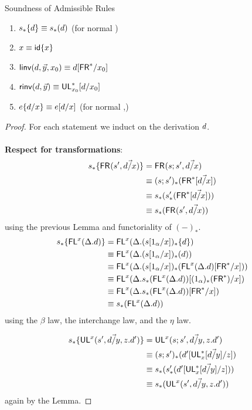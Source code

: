 \begin{theorem}{Soundness of Admissible Rules} \label{thm:admissible-soundess}
\begin{enumerate}
\item $s_*\{d\} \equiv s_*(d)$ (for normal \D)
\item $x \equiv {\ensuremath{\mathsf{id}}\{x\}}$
\item $\mathsf{linv}(d,\vec{y},x_0) \equiv d[\mathsf{FR}^*/x_0]$
\item $\mathsf{rinv}(d,\vec{y}) \equiv \mathsf{UL}^*_{x_0}[d/x_0]$
\item $e\{d/x\} \equiv e[d/x]$ (for normal \D,\E)
\end{enumerate}
\end{theorem}
\begin{proof}
For each statement we induct on the derivation $d$. \\~\\
\textbf{Respect for transformations}:
\begin{align*}
s_*\{\mathsf{FR}_{}(s',\vec{d/x})\} 
&= \mathsf{FR}_{}(s;s',\vec{d/x}) \\
&\equiv (s;s')_*(\mathsf{FR}^*[\vec{d/x}]) \\
&\equiv s_*(s'_*(\mathsf{FR}^*[\vec{d/x}])) \\
&\equiv s_*(\mathsf{FR}_{}(s',\vec{d/x}))
\end{align*}
using the previous Lemma and functoriality of $(-)_*$.
\begin{align*}
s_*\{\mathsf{FL}^{x}(\Delta.d)\} 
&= \mathsf{FL}^{x}(\Delta.(s[1_\alpha/x])_*\{d\}) \\
&\equiv \mathsf{FL}^{x}(\Delta.(s[1_\alpha/x])_*(d)) \\
&\equiv \mathsf{FL}^{x}(\Delta.(s[1_\alpha/x])_*(\mathsf{FL}^{x}(\Delta.d)[\mathsf{FR}^*/x]))\\
&\equiv \mathsf{FL}^{x}(\Delta. s_*(\mathsf{FL}^{x}(\Delta.d))[(1_\alpha)_*(\mathsf{FR}^*)/x])\\
&\equiv \mathsf{FL}^{x}(\Delta. s_*(\mathsf{FL}^{x}(\Delta.d))[\mathsf{FR}^*/x])\\
&\equiv s_*(\mathsf{FL}^{x}(\Delta.d)) 
\end{align*}
using the $\beta$ law, the interchange law, and the $\eta$ law.

\begin{align*}
s_*\{\mathsf{UL}^{x}_{}(s',\vec{d/y},z.d')\} 
&= \mathsf{UL}^{x}_{}(s;s',\vec{d/y},z.d') \\
&\equiv (s;s')_*(d'[\mathsf{UL}^*_{x}[\vec{d/y}]/z]) \\
&\equiv s_*(s'_*(d'[\mathsf{UL}^*_{x}[\vec{d/y}]/z])) \\
&\equiv s_*(\mathsf{UL}^{x}_{}(s',\vec{d/y},z.d')) 
\end{align*}
again by the Lemma.


\end{proof}
